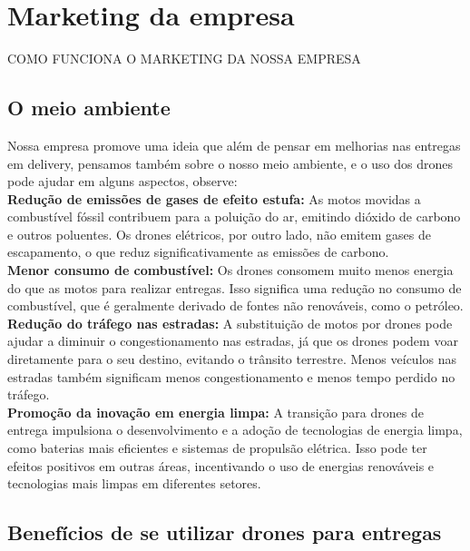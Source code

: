 \chapter{Marketing da empresa}
\label{ch:identificador}

COMO FUNCIONA O MARKETING DA NOSSA EMPRESA

\section{O meio ambiente}
Nossa empresa promove uma ideia que além de pensar em melhorias nas entregas em delivery, pensamos também sobre o nosso meio ambiente, e o uso dos drones pode ajudar em alguns aspectos, observe:\\

\textbf{Redução de emissões de gases de efeito estufa:} As motos movidas a combustível fóssil contribuem para a poluição do ar, emitindo dióxido de carbono e outros poluentes. Os drones elétricos, por outro lado, não emitem gases de escapamento, o que reduz significativamente as emissões de carbono.\\

\textbf{Menor consumo de combustível:} Os drones consomem muito menos energia do que as motos para realizar entregas. Isso significa uma redução no consumo de combustível, que é geralmente derivado de fontes não renováveis, como o petróleo.\\

\textbf{Redução do tráfego nas estradas:} A substituição de motos por drones pode ajudar a diminuir o congestionamento nas estradas, já que os drones podem voar diretamente para o seu destino, evitando o trânsito terrestre. Menos veículos nas estradas também significam menos congestionamento e menos tempo perdido no tráfego.\\

\textbf{Promoção da inovação em energia limpa:} A transição para drones de entrega impulsiona o desenvolvimento e a adoção de tecnologias de energia limpa, como baterias mais eficientes e sistemas de propulsão elétrica. Isso pode ter efeitos positivos em outras áreas, incentivando o uso de energias renováveis e tecnologias mais limpas em diferentes setores\cite{Ifood2022}\cite{Ifood2021}. 

\section{Benefícios de se utilizar drones para entregas}

